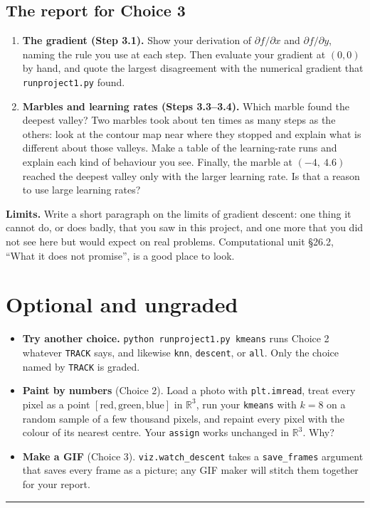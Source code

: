 \documentclass[11pt]{article}
\theoremstyle{definition}
\newcommand{\R}{\mathbb{R}}
\newcommand{\file}[1]{\texttt{#1}}
\begin{document}
\subsection*{The report for Choice 3}

\begin{enumerate}[label=\textbf{R\arabic*.},leftmargin=2.6em,itemsep=6pt,topsep=4pt]
  \item \textbf{The gradient (Step 3.1).} Show your derivation of
        $\partial f/\partial x$ and $\partial f/\partial y$, naming the rule
        you use at each step. Then evaluate your gradient at $(0,0)$ by hand,
        and quote the largest disagreement with the numerical gradient that
        \file{runproject1.py} found.
  \item \textbf{Marbles and learning rates (Steps 3.3--3.4).} Which marble
        found the deepest valley? Two marbles took about ten times as many
        steps as the others: look at the contour map near where they stopped
        and explain what is different about those valleys. Make a table of the
        learning-rate runs and explain each kind of behaviour you see. Finally,
        the marble at $(-4,\ 4.6)$ reached the deepest valley only with the
        larger learning rate. Is that a reason to use large learning rates?
\end{enumerate}

\noindent\textbf{Limits.} Write a short paragraph on the limits of gradient
descent: one thing it cannot do, or does badly, that you saw in this project,
and one more that you did not see here but would expect on real problems.
Computational unit \S26.2, ``What it does not promise'', is a good place to look.

\section*{Optional and ungraded}
\begin{itemize}[leftmargin=1.4em,itemsep=5pt,topsep=3pt]
  \item \textbf{Try another choice.} \texttt{python runproject1.py kmeans} runs
        Choice 2 whatever \texttt{TRACK} says, and likewise \texttt{knn},
        \texttt{descent}, or \texttt{all}. Only the choice named by
        \texttt{TRACK} is graded.
  \item \textbf{Paint by numbers} (Choice 2). Load a photo with
        \texttt{plt.imread}, treat every pixel as a point
        $[\text{red},\text{green},\text{blue}]$ in $\R^{3}$, run your
        \texttt{kmeans} with $k=8$ on a random sample of a few thousand pixels,
        and repaint every pixel with the colour of its nearest centre. Your
        \texttt{assign} works unchanged in $\R^{3}$. Why?
  \item \textbf{Make a GIF} (Choice 3). \texttt{viz.watch\_descent} takes a
        \texttt{save\_frames} argument that saves every frame as a picture; any
        GIF maker will stitch them together for your report.
\end{itemize}

\bigskip
\noindent\rule{\textwidth}{0.4pt}

\smallskip
{}
\end{document}
